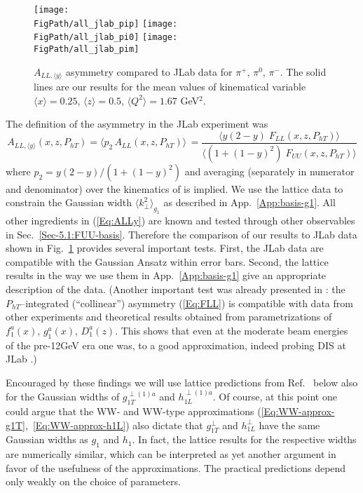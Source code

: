 \documentclass[a4paper,11pt]{article}
\newcommand{\be}{\begin{equation}}
\newcommand{\ee}{\end{equation}}
\newcommand{\la}{\langle}
\newcommand{\ra}{\rangle}
\def\Phperp{P_{hT}}
\def\kperp{k_\perp}
\newcommand*{\FigPath}{./figs}%
\begin{document}
\begin{figure}[b]
\centering 
\texttt{[image: \\FigPath/all\_jlab\_pip]}  
\texttt{[image: \\FigPath/all\_jlab\_pi0]}  
\texttt{[image: \\FigPath/all\_jlab\_pim]}  
\caption{\label{jlab_ALL} 
	$A_{LL,\la y\ra}$ asymmetry compared to JLab data \cite{Avakian:2010ae}
 	for $\pi^+$, $\pi^0$, $\pi^-$. The solid lines are 
	our results for the mean values of kinematical variable
	$\langle x \rangle = 0.25$, 
	$\langle z \rangle = 0.5$, $\langle Q^2 \rangle = 1.67$ GeV$^2$.
}
\end{figure}

The definition of the asymmetry in  the JLab experiment \cite{Avakian:2010ae} 
was
\be\label{Eq:ALLy}
	A_{LL,\la y\ra}(x,z,\Phperp) 
	= \la p_2 \,A_{LL}(x,z,\Phperp) \ra \, 
	= \frac{\la y (2-y) \; F_{LL}(x,z,\Phperp)\ra}
	{\la(1+(1-y)^2) \; F_{UU}(x,z,\Phperp)\ra} 
\ee 
where $p_2 = y (2-y)/(1+(1-y)^2)$ and averaging (separately in numerator 
and denominator) over the kinematics of \cite{Avakian:2010ae} is implied. 
We use the lattice data \cite{Hagler:2009mb} to
constrain the Gaussian width $\la\kperp^2\ra_{g_1}$ as described in 
App.~\ref{App:basis-g1}. All other ingredients in (\ref{Eq:ALLy}) are known 
and tested through other observables in Sec.~\ref{Sec-5.1:FUU-basis}.
Therefore the comparison of our results to JLab data \cite{Avakian:2010ae} 
shown in Fig.~\ref{jlab_ALL} provides several important tests.
First, the JLab data \cite{Avakian:2010ae} are compatible
with the Gaussian Ansatz within error bars. Second, the lattice results
in the way we use them in App.~\ref{App:basis-g1} give an appropriate 
description of the data.
	(Another important test was already presented in 
	\cite{Avakian:2010ae}: the $\Phperp$--integrated (``collinear'')
	asymmetry (\ref{Eq:FLL}) is compatible with data
	from other experiments and theoretical results obtained from
	parametrizations of $f_1^a(x)$, $g_1^a(x)$, $D_1^a(z)$. This 
	shows that even at the moderate beam energies of the pre-12GeV 
	era one was, to a good approximation, indeed probing DIS at JLab
	\cite{Avakian:2010ae}.)


Encouraged by these findings we will use lattice predictions from 
Ref.~\cite{Hagler:2009mb} below also for the Gaussian widths of 
$g_{1T}^{\perp(1)a}$ and $h_{1L}^{\perp(1)a}$.
Of course, at this point one could argue that the WW- and WW-type 
approximations (\ref{Eq:WW-approx-g1T},~\ref{Eq:WW-approx-h1L}) also
dictate that $g_{1T}^\perp$ and $h_{1L}^\perp$ have the same Gaussian
widths as $g_1$ and $h_1$. In fact, the lattice results for the 
respective widths are numerically similar, which can be interpreted as 
yet another argument in favor of the usefulness of the approximations. 
The practical predictions depend only weakly on the choice of parameters.
\end{document}
